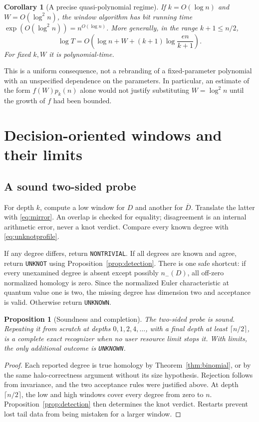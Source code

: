 \documentclass[11pt]{article}
\newtheorem{proposition}[theorem]{Proposition}
\newtheorem{corollary}[theorem]{Corollary}
\theoremstyle{definition}\newtheorem{definition}[theorem]{Definition}
\theoremstyle{remark}\newtheorem{remark}[theorem]{Remark}
\begin{document}
\begin{corollary}[A precise quasi-polynomial regime]\label{cor:qp}
If $k=O(\log n)$ and $W=O(\log^2 n)$, the window algorithm has bit running time $\exp(O(\log^2 n))=n^{O(\log n)}$. More generally, in the range $k+1\leq n/2$,
\[
 \log T=O\!\left(\log n+W+(k+1)\log\frac{en}{k+1}\right).
\]
For fixed $k,W$ it is polynomial-time.
\end{corollary}

This is a uniform consequence, not a rebranding of a fixed-parameter polynomial with an unspecified dependence on the parameters. In particular, an estimate of the form $f(W)p_k(n)$ alone would not justify substituting $W=\log^2 n$ until the growth of $f$ had been bounded.

\section{Decision-oriented windows and their limits}
\label{sec:decision}
\subsection{A sound two-sided probe}
For depth $k$, compute a low window for $D$ and another for $\overline D$. Translate the latter with \eqref{eq:mirror}. An overlap is checked for equality; disagreement is an internal arithmetic error, never a knot verdict. Compare every known degree with \eqref{eq:unknotprofile}.

If any degree differs, return \texttt{NONTRIVIAL}. If all degrees are known and agree, return \texttt{UNKNOT} using Proposition~\ref{prop:detection}. There is one safe shortcut: if every unexamined degree is absent except possibly $n_-(D)$, all off-zero normalized homology is zero. Since the normalized Euler characteristic at quantum value one is two, the missing degree has dimension two and acceptance is valid. Otherwise return \texttt{UNKNOWN}.

\begin{proposition}[Soundness and completion]\label{prop:adaptive}
The two-sided probe is sound. Repeating it from scratch at depths $0,1,2,4,\ldots$, with a final depth at least $\lceil n/2\rceil$, is a complete exact recognizer when no user resource limit stops it. With limits, the only additional outcome is \texttt{UNKNOWN}.
\end{proposition}
\begin{proof}
Each reported degree is true homology by Theorem~\ref{thm:binomial}, or by the same halo-correctness argument without its size hypothesis. Rejection follows from invariance, and the two acceptance rules were justified above. At depth $\lceil n/2\rceil$, the low and high windows cover every degree from zero to $n$. Proposition~\ref{prop:detection} then determines the knot verdict. Restarts prevent lost tail data from being mistaken for a larger window.
\end{proof}
\end{document}
